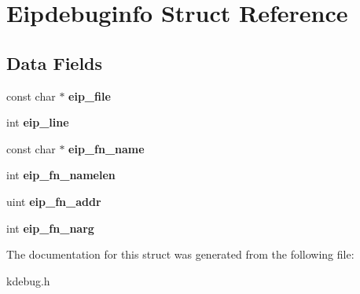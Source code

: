 \hypertarget{structEipdebuginfo}{}\section{Eipdebuginfo Struct Reference}
\label{structEipdebuginfo}
\subsection*{Data Fields}
\begin{DoxyCompactItemize}
\item 
const char $\ast$ {\bfseries eip\+\_\+file}\hypertarget{structEipdebuginfo_a99b3b41ad2ea9528df161222af62321a}{}\label{structEipdebuginfo_a99b3b41ad2ea9528df161222af62321a}

\item 
int {\bfseries eip\+\_\+line}\hypertarget{structEipdebuginfo_a50c332e0b0310474b13924a4f6e9fdf4}{}\label{structEipdebuginfo_a50c332e0b0310474b13924a4f6e9fdf4}

\item 
const char $\ast$ {\bfseries eip\+\_\+fn\+\_\+name}\hypertarget{structEipdebuginfo_a5e8cc118e7d6fd43dfaf6126cb2a4fe0}{}\label{structEipdebuginfo_a5e8cc118e7d6fd43dfaf6126cb2a4fe0}

\item 
int {\bfseries eip\+\_\+fn\+\_\+namelen}\hypertarget{structEipdebuginfo_afacac024e9d624f641169c9bb095b2b6}{}\label{structEipdebuginfo_afacac024e9d624f641169c9bb095b2b6}

\item 
uint {\bfseries eip\+\_\+fn\+\_\+addr}\hypertarget{structEipdebuginfo_a862fd972f792c828e2f2519e57c7f011}{}\label{structEipdebuginfo_a862fd972f792c828e2f2519e57c7f011}

\item 
int {\bfseries eip\+\_\+fn\+\_\+narg}\hypertarget{structEipdebuginfo_a78772b4f4ca1428fe983cd7778324504}{}\label{structEipdebuginfo_a78772b4f4ca1428fe983cd7778324504}

\end{DoxyCompactItemize}


The documentation for this struct was generated from the following file\+:\begin{DoxyCompactItemize}
\item 
kdebug.\+h\end{DoxyCompactItemize}
